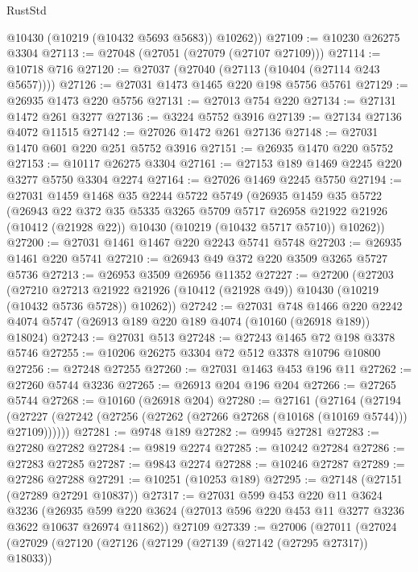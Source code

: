 \begin{lexlean}{RustStd}
\begin{coremodule}
        @10430
        (@10219 (@10432 @5693 @5683))
        @10262))
@27109 := @10230 @26275 @3304
@27113 := @27048 (@27051 (@27079 (@27107 @27109)))
@27114 := @10718 @716
@27120 := @27037 (@27040 (@27113 (@10404 (@27114 @243 @5657))))
@27126 := @27031 @1473 @1465 @220 @198 @5756 @5761
@27129 := @26935 @1473 @220 @5756
@27131 := @27013 @754 @220
@27134 := @27131 @1472 @261 @3277
@27136 := @3224 @5752 @3916
@27139 := @27134 @27136 @4072 @11515
@27142 := @27026 @1472 @261 @27136
@27148 := @27031 @1470 @601 @220 @251 @5752 @3916
@27151 := @26935 @1470 @220 @5752
@27153 := @10117 @26275 @3304
@27161 := @27153 @189 @1469 @2245 @220 @3277 @5750 @3304 @2274
@27164 := @27026 @1469 @2245 @5750
@27194 := @27031
    @1459
    @1468
    @35
    @2244
    @5722
    @5749
    (@26935
      @1459
      @35
      @5722
      (@26943
        @22
        @372
        @35
        @5335
        @3265
        @5709
        @5717
        @26958
        @21922
        @21926
        (@10412 (@21928 @22))
        @10430
        (@10219 (@10432 @5717 @5710))
        @10262))
@27200 := @27031 @1461 @1467 @220 @2243 @5741 @5748
@27203 := @26935 @1461 @220 @5741
@27210 := @26943 @49 @372 @220 @3509 @3265 @5727 @5736
@27213 := @26953 @3509 @26956 @11352
@27227 := @27200
    (@27203
      (@27210
        @27213
        @21922
        @21926
        (@10412 (@21928 @49))
        @10430
        (@10219 (@10432 @5736 @5728))
        @10262))
@27242 := @27031
    @748
    @1466
    @220
    @2242
    @4074
    @5747
    (@26913 @189 @220 @189 @4074 (@10160 (@26918 @189)) @18024)
@27243 := @27031 @513
@27248 := @27243 @1465 @72 @198 @3378 @5746
@27255 := @10206 @26275 @3304 @72 @512 @3378 @10796 @10800
@27256 := @27248 @27255
@27260 := @27031 @1463 @453 @196 @11
@27262 := @27260 @5744 @3236
@27265 := @26913 @204 @196 @204
@27266 := @27265 @5744
@27268 := @10160 (@26918 @204)
@27280 := @27161
    (@27164
      (@27194 (@27227 (@27242 (@27256 (@27262 (@27266 @27268 (@10168 (@10169 @5744))) @27109))))))
@27281 := @9748 @189
@27282 := @9945 @27281
@27283 := @27280 @27282
@27284 := @9819 @2274
@27285 := @10242 @27284
@27286 := @27283 @27285
@27287 := @9843 @2274
@27288 := @10246 @27287
@27289 := @27286 @27288
@27291 := @10251 (@10253 @189)
@27295 := @27148 (@27151 (@27289 @27291 @10837))
@27317 := @27031
    @599
    @453
    @220
    @11
    @3624
    @3236
    (@26935 @599 @220 @3624 (@27013 @596 @220 @453 @11 @3277 @3236 @3622 @10637 @26974 @11862))
    @27109
@27339 := @27006
    (@27011
      (@27024
        (@27029
          (@27120
            (@27126
              (@27129 (@27139 (@27142 (@27295 @27317)) @18033))

\end{coremodule}
\end{lexlean}
